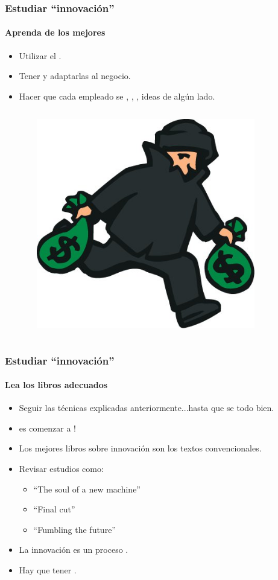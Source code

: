\frame
{
\frametitle{Estudiar ``innovación''}
\framesubtitle{Aprenda de los mejores}
\begin{itemize}
	\item Utilizar el .
	\item Tener  y adaptarlas al negocio.
	\item Hacer que cada empleado se , , ,  ideas de algún lado.
\end{itemize}
\begin{columns}
\begin{column}{0.6\textwidth}
\end{column}
\begin{column}{0.4\textwidth}
	\includegraphics[width=0.8\textwidth]{img/robo}
\end{column}
\end{columns}
}

\frame
{
\frametitle{Estudiar ``innovación''}
\framesubtitle{Lea los libros adecuados}
\begin{itemize}
	\item Seguir las técnicas explicadas anteriormente...hasta que  se  todo bien.
	\item {} es comenzar a !
	\item Los mejores libros sobre innovación  son los textos convencionales.
	\item Revisar estudios como:
	\begin{itemize}
		\item ``The soul of a new machine'' %
		\item ``Final cut'' %
		\item ``Fumbling the future'' %
	\end{itemize}
	\item La innovación es un proceso .
	\item Hay que tener .
\end{itemize}
}
